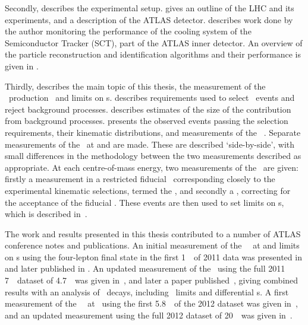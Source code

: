 Secondly,  describes the experimental setup.
 gives an outline of the LHC and its experiments, and a
description of the ATLAS detector.  describes work done by the author
monitoring the performance of the cooling system of the Semiconductor Tracker
(SCT), part of the ATLAS inner detector. An overview of the particle reconstruction and
identification algorithms and their performance is given in
.

Thirdly,  describes the main topic of this thesis, the
measurement of the \ZZ\ production \cx\ and limits on \TGC s. 
 describes requirements used to select \ZZ\
events and reject background processes.  describes
estimates of the size of the contribution from background processes.
\chap{CrossSection} presents the observed events passing the selection
requirements, their kinematic distributions, and measurements of the \ZZ\ \cx.
Separate measurements of the \cx\ at \sqrtseq{7} and \sqrtseq{8} are made. These
are described `side-by-side', with small differences in the methodology between
the two measurements described as appropriate. At each centre-of-mass energy,
two measurements of the \cx\ are given: firstly a measurement in a restricted
fiducial \phasespace\ corresponding closely to the experimental kinematic
selections, termed the \intro{fiducial \cx}, and secondly a \intro{total} \cx,
correcting for the acceptance of the fiducial \phasespace.
These events are then used to set limits on \TGC s, which is described
in~\chap{TGCLimits}.

The work and results presented in this thesis contributed to a number of ATLAS conference
notes and publications. An initial measurement of the \ZZ\ \cx\ at \sqrtseq{7}
and limits on \TGC s using the four-lepton final state in the first 1~\ifb\ of
2011 data was
presented in \cite{ATLAS-CONF-2011-107} and later published in
\cite{ATLAS_ZZ4l:1fb2011}. An updated measurement of the \cx\ using the full
2011 7~\tev\ dataset of 4.7~\ifb\ was given in~\cite{ATLAS-CONF-2012-026}, and later
a paper published~\cite{ATLAS:2012kg}, giving combined results with an analysis
of \ZZllvv\ decays, including \TGC\ limits and differential \cx s.
A first measurement of the \ZZ\ \cx\ at \sqrtseq{8} \cx\ using the first
5.8~\ifb\ of the 2012 dataset was given in~\cite{ATLAS-CONF-2012-090}, and an
updated measurement using the full 2012 dataset of 20~\ifb\ was given in~\cite{ATLAS-CONF-2013-020}.

